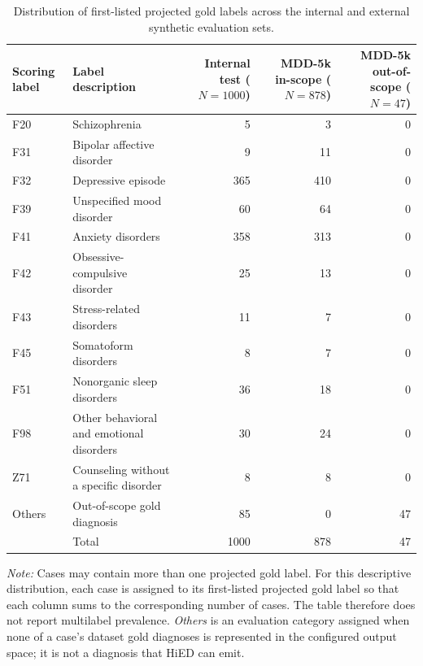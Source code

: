 \documentclass[12pt,a4paper,oneside]{report}
\begin{document}
\begin{table}[htbp]
\centering
\caption{Distribution of first-listed projected gold labels across the internal and external synthetic evaluation sets.}
\label{tab:class-distribution}
\small
\begin{adjustbox}{max width=\textwidth}
\begin{tabular}{|l|l|r|r|r|}
\hline
Scoring label & Label description &
\shortstack{\rule{0pt}{2.4ex}Internal test\\($N=1000$)} &
\shortstack{\rule{0pt}{2.4ex}MDD-5k in-scope\\($N=878$)} &
\shortstack{\rule{0pt}{2.4ex}MDD-5k out-of-scope\\($N=47$)}\\
\hline
F20 & Schizophrenia & 5 & 3 & 0\\
\hline
F31 & Bipolar affective disorder & 9 & 11 & 0\\
\hline
F32 & Depressive episode & 365 & 410 & 0\\
\hline
F39 & Unspecified mood disorder & 60 & 64 & 0\\
\hline
F41 & Anxiety disorders & 358 & 313 & 0\\
\hline
F42 & Obsessive-compulsive disorder & 25 & 13 & 0\\
\hline
F43 & Stress-related disorders & 11 & 7 & 0\\
\hline
F45 & Somatoform disorders & 8 & 7 & 0\\
\hline
F51 & Nonorganic sleep disorders & 36 & 18 & 0\\
\hline
F98 & Other behavioral and emotional disorders & 30 & 24 & 0\\
\hline
Z71 & Counseling without a specific disorder & 8 & 8 & 0\\
\hline
Others & Out-of-scope gold diagnosis & 85 & 0 & 47\\
\hline
 & Total & 1000 & 878 & 47\\
\hline
\end{tabular}
\end{adjustbox}
\end{table}

\noindent\textit{Note:} Cases may contain more than one projected gold label. For this descriptive distribution, each case is assigned to its first-listed projected gold label so that each column sums to the corresponding number of cases. The table therefore does not report multilabel prevalence. \emph{Others} is an evaluation category assigned when none of a case's dataset gold diagnoses is represented in the configured output space; it is not a diagnosis that HiED can emit.
\end{document}
